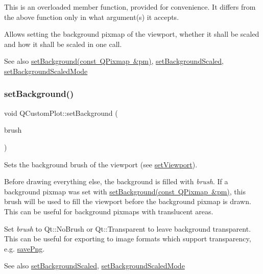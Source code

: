 This is an overloaded member function, provided for convenience. It differs from the above function only in what argument(s) it accepts.

Allows setting the background pixmap of the viewport, whether it shall be scaled and how it shall be scaled in one call.

\begin{DoxySeeAlso}{See also}
\mbox{\hyperlink{class_q_custom_plot_a130358592cfca353ff3cf5571b49fb00}{set\+Background(const Q\+Pixmap \&pm)}}, \mbox{\hyperlink{class_q_custom_plot_a36f0fa1317325dc7b7efea615ee2de1f}{set\+Background\+Scaled}}, \mbox{\hyperlink{class_q_custom_plot_a4c0eb4865b7949f62e1cb97db04a3de0}{set\+Background\+Scaled\+Mode}} 
\end{DoxySeeAlso}
\mbox{\label{class_q_custom_plot_a8ed256cf467bfa7ba1f9feaae62c3bd0}} 
\subsubsection{\texorpdfstring{setBackground()}{setBackground()}\hspace{0.1cm}{\footnotesize\ttfamily [3/3]}}
{\footnotesize\ttfamily void Q\+Custom\+Plot\+::set\+Background (\begin{DoxyParamCaption}\item[{const Q\+Brush \&}]{brush }\end{DoxyParamCaption})}

Sets the background brush of the viewport (see \mbox{\hyperlink{class_q_custom_plot_a3f9bc4b939dd8aaba9339fd09f273fc4}{set\+Viewport}}).

Before drawing everything else, the background is filled with {\itshape brush}. If a background pixmap was set with \mbox{\hyperlink{class_q_custom_plot_a130358592cfca353ff3cf5571b49fb00}{set\+Background(const Q\+Pixmap \&pm)}}, this brush will be used to fill the viewport before the background pixmap is drawn. This can be useful for background pixmaps with translucent areas.

Set {\itshape brush} to Qt\+::\+No\+Brush or Qt\+::\+Transparent to leave background transparent. This can be useful for exporting to image formats which support transparency, e.\+g. \mbox{\hyperlink{class_q_custom_plot_ac92cc9256d12f354b40a4be4600b5fb9}{save\+Png}}.

\begin{DoxySeeAlso}{See also}
\mbox{\hyperlink{class_q_custom_plot_a36f0fa1317325dc7b7efea615ee2de1f}{set\+Background\+Scaled}}, \mbox{\hyperlink{class_q_custom_plot_a4c0eb4865b7949f62e1cb97db04a3de0}{set\+Background\+Scaled\+Mode}} 
\end{DoxySeeAlso}
\mbox{\label{class_q_custom_plot_a36f0fa1317325dc7b7efea615ee2de1f}} 
